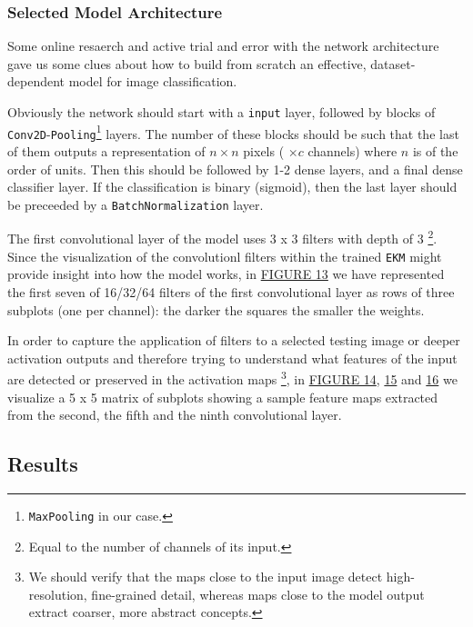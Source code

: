 \documentclass[10pt,]{article}
\begin{document}
\hypertarget{model-architecture}{%
\subsubsection{Selected Model Architecture}\label{model-architecture}}

Some online resaerch and active trial and error with the network
architecture gave us some clues about how to build from scratch an
effective, dataset-dependent model for image classification.

Obviously the network should start with a \texttt{input} layer, followed
by blocks of \texttt{Conv2D}-\texttt{Pooling}\footnote{\texttt{MaxPooling}
  in our case.} layers. The number of these blocks should be such that
the last of them outputs a representation of \(n \times n\) pixels (
\(\times c\) channels) where \(n\) is of the order of units. Then this
should be followed by 1-2 dense layers, and a final dense classifier
layer. If the classification is binary (sigmoid), then the last layer
should be preceeded by a \texttt{BatchNormalization} layer.

The first convolutional layer of the model uses 3 x 3 filters with depth
of 3 \footnote{Equal to the number of channels of its input.}. Since the
visualization of the convolutionl filters within the trained
\texttt{EKM} might provide insight into how the model works, in
\protect\hyperlink{filters-featuremaps}{FIGURE 13} we have represented
the first seven of 16/32/64 filters of the first convolutional layer as
rows of three subplots (one per channel): the darker the squares the
smaller the weights.

In order to capture the application of filters to a selected testing
image or deeper activation outputs and therefore trying to understand
what features of the input are detected or preserved in the activation
maps \footnote{We should verify that the maps close to the input image
  detect high-resolution, fine-grained detail, whereas maps close to the
  model output extract coarser, more abstract concepts.}, in
\protect\hyperlink{filters-featuremaps}{FIGURE 14},
\protect\hyperlink{filters-featuremaps}{15} and
\protect\hyperlink{filters-featuremaps}{16} we visualize a 5 x 5 matrix
of subplots showing a sample feature maps extracted from the second, the
fifth and the ninth convolutional layer.

\hypertarget{results}{%
\subsection{\texorpdfstring{\textbf{Results}}{Results}}\label{results}}
\end{document}
